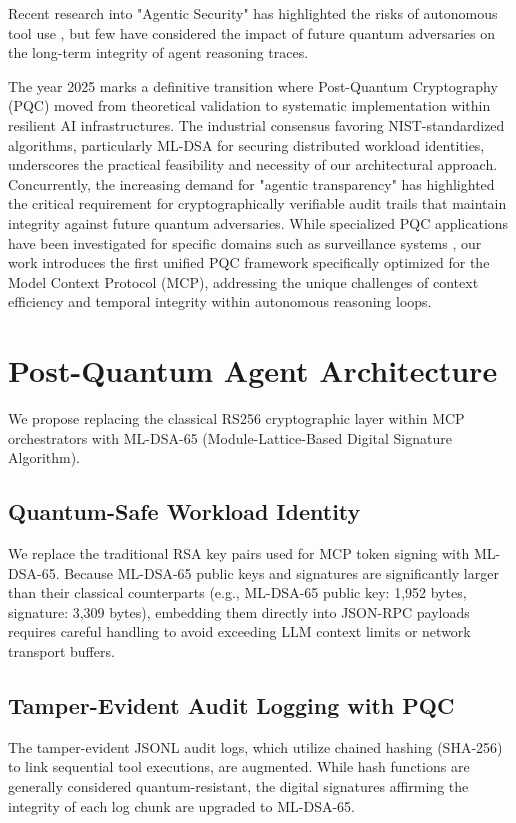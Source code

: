 \documentclass[conference]{IEEEtran}
\begin{document}
Recent research into "Agentic Security" has highlighted the risks of autonomous tool use \cite{agenticsec2025}, but few have considered the impact of future quantum adversaries on the long-term integrity of agent reasoning traces.

The year 2025 marks a definitive transition where Post-Quantum Cryptography (PQC) moved from theoretical validation to systematic implementation within resilient AI infrastructures. The industrial consensus favoring NIST-standardized algorithms, particularly ML-DSA for securing distributed workload identities, underscores the practical feasibility and necessity of our architectural approach. Concurrently, the increasing demand for "agentic transparency" has highlighted the critical requirement for cryptographically verifiable audit trails that maintain integrity against future quantum adversaries. While specialized PQC applications have been investigated for specific domains such as surveillance systems \cite{dhinakaran2026pqc}, our work introduces the first unified PQC framework specifically optimized for the Model Context Protocol (MCP), addressing the unique challenges of context efficiency and temporal integrity within autonomous reasoning loops.

\section{Post-Quantum Agent Architecture}
We propose replacing the classical RS256 cryptographic layer within MCP orchestrators with ML-DSA-65 (Module-Lattice-Based Digital Signature Algorithm). 

\subsection{Quantum-Safe Workload Identity}
We replace the traditional RSA key pairs used for MCP token signing with ML-DSA-65. Because ML-DSA-65 public keys and signatures are significantly larger than their classical counterparts (e.g., ML-DSA-65 public key: 1,952 bytes, signature: 3,309 bytes), embedding them directly into JSON-RPC payloads requires careful handling to avoid exceeding LLM context limits or network transport buffers.

\subsection{Tamper-Evident Audit Logging with PQC}
The tamper-evident JSONL audit logs, which utilize chained hashing (SHA-256) to link sequential tool executions, are augmented. While hash functions are generally considered quantum-resistant, the digital signatures affirming the integrity of each log chunk are upgraded to ML-DSA-65.
\end{document}
